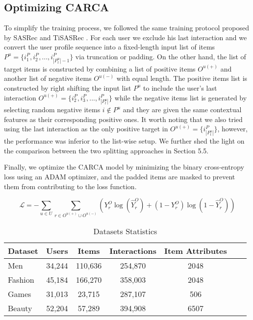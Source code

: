 \documentclass[sigconf,natbib=true]{acmart}
\begin{document}
\subsection{Optimizing CARCA}
To simplify the training process, we followed the same training protocol proposed by SASRec and TiSASRec \cite{kang2018self, li2020time}. For each user we exclude his last interaction and we convert the user profile sequence into a fixed-length input list of items $P^{u} =\{i^{P}_{1}, i^{P}_{2}, ..., i^{P}_{|P^{u}_{t}|-1}\}$ via truncation or padding. On the other hand, the list of target items is constructed by combining a list of positive items $O^{u(+)}$ and another list of negative items $O^{u(-)}$ with equal length. The positive items list is constructed by right shifting the input list $P^{u}$ to include the user's last interaction $O^{u(+)} =\{i^{P}_{2}, i^{P}_{3}, ..., i^{P}_{|P^{u}_{t}|}\}$ while the negative items list is generated by selecting random negative items $i \notin P^{u}$ and they are given the same contextual features as their corresponding positive ones. It worth noting that we also tried using the last interaction as the only positive target in $O^{u(+)} =\{i^{P}_{|P^{u}_{t}|}\}$, however, the performance was inferior to the list-wise setup. We further shed the light on the comparison between the two splitting approaches in Section 5.5.

Finally, we optimize the CARCA model by minimizing the binary cross-entropy loss using an ADAM optimizer, and the padded items are masked to prevent them from contributing to the loss function.

\begin{equation}
    \mathcal{L}=- \sum_{u \in U} \sum_{r \in O^{u(+)} \cup O^{u(-)}} 
    \left(Y^{O}_r \log(\hat{Y}^{O}_r)+ (1-Y^{O}_r)\log(1-\hat{Y}^{O}_r ) \right)
\end{equation}








\begin{table}[!ht]
\caption{Datasets Statistics}
\label{datasets}
\small
\begin{center}
  \begin{tabular}{lcccccc}
    \toprule
    Dataset&Users&Items&Interactions&Item Attributes\\
    \midrule
Men & 34,244 & 110,636 & 254,870 & 2048 \\
Fashion & 45,184 & 166,270 & 358,003 & 2048  \\
Games & 31,013 & 23,715 & 287,107 & 506   \\
Beauty & 52,204 & 57,289 & 394,908 & 6507  \\
   \bottomrule
  \end{tabular}
  \end{center}
\end{table}
\end{document}
